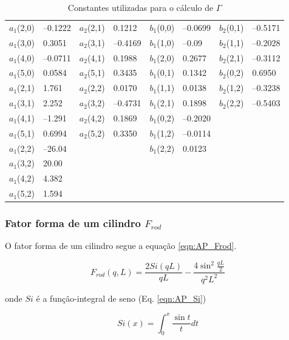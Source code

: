 \begin{apendicesenv}
\begin{table}[h]
    \IBGEtab%
    {\caption{Constantes utilizadas para o cálculo de $\Gamma$}
    \label{tab_ap:AiBi}}%
    {\begin{tabular}{r l | r l | r l | r l}
    \toprule
    $a_1$(2,0) & --0.1222 & $a_2$(2,1) & 0.1212 & $b_1$(0,0) &
    --0.0699 & $b_2$(0,1) & --0.5171\\
    $a_1$(3,0) & 0.3051 & $a_2$(3,1) & --0.4169 & $b_1$(1,0) & --0.09
    & $b_2$(1,1) & --0.2028\\
    $a_1$(4,0) & --0.0711 & $a_2$(4,1) & 0.1988 & $b_1$(2,0) &
    0.2677 & $b_2$(2,1) & --0.3112\\
    $a_1$(5,0) & 0.0584 & $a_2$(5,1) & 0.3435 & $b_1$(0,1) & 0.1342
    & $b_2$(0,2) & 0.6950\\
    $a_1$(2,1) & 1.761 & $a_2$(2,2) & 0.0170 & $b_1$(1,1) & 0.0138 &
    $b_2$(1,2) & --0.3238\\
    $a_1$(3,1) & 2.252 & $a_2$(3,2) & --0.4731 & $b_1$(2,1) & 0.1898
    & $b_2$(2,2) & --0.5403\\
    $a_1$(4,1) & --1.291 & $a_2$(4,2) & 0.1869 & $b_1$(0,2) & --0.2020
    & &\\
    $a_1$(5,1) & 0.6994 & $a_2$(5,2) & 0.3350 & $b_1$(1,2) & --0.0114
    & &\\
    $a_1$(2,2) & --26.04 & & & $b_1$(2,2) & 0.0123 & &\\
    $a_1$(3,2) & 20.00 & & & & & &\\
    $a_1$(4,2) & 4.382 & & & & & &\\
    $a_1$(5,2) & 1.594 & & & & & &\\
    \bottomrule
   \end{tabular} }%
    {}%
\end{table}

\subsubsection{Fator forma de um cilindro $F_{rod}$}

O fator forma de um cilindro segue a equação \ref{eqn:AP_Frod}.

\begin{equation}
F_{rod}(q, L) = \frac{2Si(qL)}{qL} - \frac{4\sin^2\frac{qL}{2}}{q^2L^2}
\label{eqn:AP_Frod}
\end{equation}

\noindent onde $Si$ é a função-integral de seno (Eq. \ref{eqn:AP_Si})

\begin{equation}
Si(x) = \int_0^x \frac{\sin t}{t}dt
\label{eqn:AP_Si}
\end{equation}


\end{apendicesenv}
